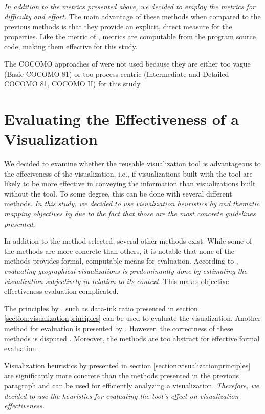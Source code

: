 \emph{In addition to the metrics presented above, we decided to employ the \citeauthor{halstead_elements_1977} metrics for difficulty and effort.} The main advantage of these methods when compared to the previous methods is that they provide an explicit, direct measure for the properties. Like the metric of \citeauthor{mccabe_complexity_1976}, \citeauthor{halstead_elements_1977} metrics are computable from the program source code, making them effective for this study.

The COCOMO approaches of \citet{boehm_software_1981} were not used because they are either too vague (Basic COCOMO 81) or too process-centric (Intermediate and Detailed COCOMO 81, COCOMO II) for this study.

\section{Evaluating the Effectiveness of a Visualization}

We decided to examine whether the reusable visualization tool is advantageous to the effeciveness of the visualization, i.e., if visualizations built with the tool are likely to be more effective in conveying the information than visualizations built without the tool. To some degree, this can be done with several different methods. \emph{In this study, we decided to use visualization heuristics by \citet{zuk_heuristics_2006} and thematic mapping objectives by \citet{schlichtmann_visualization_2002} due to the fact that those are the most concrete guidelines presented.}

In addition to the method selected, several other methods exist. While some of the methods are more concrete than others, it is notable that none of the methods provides formal, computable means for evaluation. According to \citet{kraak_cartographic_1998}, \emph{evaluating geographical visualizations is predominantly done by estimating the visualization subjectively in relation to its context}. This makes objective effectiveness evaluation complicated.

The principles by \citet{tufte_visual_1986}, such as data-ink ratio presented in section \ref{section:visualizationprinciples} can be used to evaluate the visualization. Another method for evaluation is presented by \citet{azzam_j-b_2013}. However, the correctness of these methods is disputed \citep{kosslyn_graphics_1985,inbar_minimalism_2007}. Moreover, the methods are too abstract for effective formal evaluation.

Visualization heuristics by \citet{zuk_heuristics_2006} presented in section \ref{section:visualizationprinciples} are significantly more concrete than the methods presented in the previous paragraph and can be used for efficiently analyzing a visualization. \emph{Therefore, we decided to use the heuristics for evaluating the tool's effect on visualization effectiveness.}

